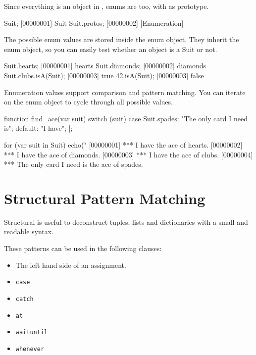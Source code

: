 Since everything is an object in \us, enums are too, with
 as prototype.

\begin{urbiscript}
Suit;
[00000001] Suit
Suit.protos;
[00000002] [Enumeration]
\end{urbiscript}

The possible enum values are stored inside the enum object. They inherit the
enum object, so you can easily test whether an object is a Suit or not.

\begin{urbiscript}
Suit.hearts;
[00000001] hearts
Suit.diamonds;
[00000002] diamonds
Suit.clubs.isA(Suit);
[00000003] true
42.isA(Suit);
[00000003] false
\end{urbiscript}

Enumeration values support comparison and pattern matching. You can iterate
on the enum object to cycle through all possible values.

\begin{urbiscript}
function find_ace(var suit)
{
  switch (suit)
  {
    case Suit.spades: "The only card I need is";
    default:          "I have";
  }
}|;

for (var suit in Suit)
  echo("%
[00000001] *** I have the ace of hearts.
[00000002] *** I have the ace of diamonds.
[00000003] *** I have the ace of clubs.
[00000004] *** The only card I need is the ace of spades.
\end{urbiscript}

\section{Structural Pattern Matching}
\label{sec:lang:pattern}

Structural  is useful to deconstruct tuples, lists and
dictionaries with a small and readable syntax.

These patterns can be used in the following clauses:
\begin{itemize}
\item The left hand side of an assignment.
\item \lstinline{case}
\item \lstinline{catch}
\item \lstinline{at}
\item \lstinline{waituntil}
\item \lstinline{whenever}
\end{itemize}

